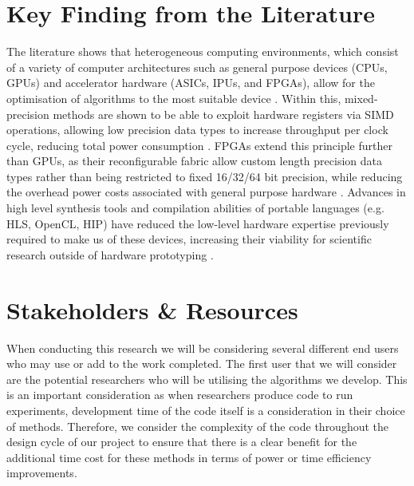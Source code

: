 \documentclass[11pt, a4paper]{article}
\begin{document}
	\section{Key Finding from the Literature}
	The literature shows that heterogeneous computing environments, which consist of a variety of computer architectures such as general purpose devices (CPUs, GPUs) and accelerator hardware (ASICs, IPUs, and FPGAs), allow for the optimisation of algorithms to the most suitable device \cite{macintoshImplementingEvaluatingHeterogeneous2019, warneHeterogeneousComputingApproach2016, macintoshImplementationParallelTridiagonal2016, cardosoChapter2Highperformance2017}. Within this, mixed-precision methods are shown to be able to exploit hardware registers via SIMD operations, allowing low precision data types to increase throughput per clock cycle, reducing total power consumption \cite{warnePulsecoupledNeuralNetwork2014, warneSolvingTriDiagonalLinear, warneVectorOperationsAccelerating2022}. FPGAs extend this principle further than GPUs, as their reconfigurable fabric allow custom length precision data types rather than being restricted to fixed 16/32/64 bit precision, while reducing the overhead power costs associated with general purpose hardware \cite{cardosoChapter2Highperformance2017, haasNestedMLMCFramework2025}. Advances in high level synthesis tools and compilation abilities of portable languages (e.g. HLS, OpenCL, HIP) have reduced the low-level hardware expertise previously required to make us of these devices, increasing their viability for scientific research outside of hardware prototyping \cite{warneComparisonHighLevel2014, macintoshImplementationParallelTridiagonal2016, macintoshImplementingEvaluatingHeterogeneous2019, warneSolvingTriDiagonalLinear, banksCALCULATIONENGINEPARAMETERS2014}. 
	
	\section{Stakeholders \& Resources}
	When conducting this research we will be considering several different end users who may use or add to the work completed. The first user that we will consider are the potential researchers who will be utilising the algorithms we develop. This is an important consideration as when researchers produce code to run experiments, development time of the code itself is a consideration in their choice of methods. Therefore, we consider the complexity of the code throughout the design cycle of our project to ensure that there is a clear benefit for the additional time cost for these methods in terms of power or time efficiency improvements.
\end{document}
